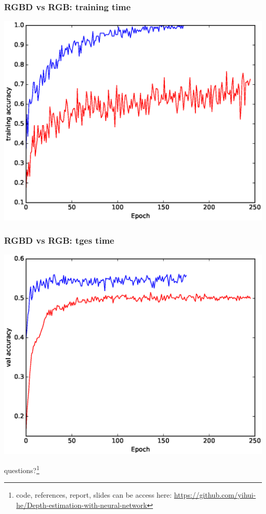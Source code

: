 \documentclass{beamer}
\begin{document}
\begin{frame}
\frametitle{RGBD vs RGB: training time}
\includegraphics[width=\linewidth]{together_train.eps}
\end{frame}


\begin{frame}
\frametitle{RGBD vs RGB: tges time}
\includegraphics[width=\linewidth]{together_test.eps}
\end{frame}


\begin{frame}
\Huge{\centerline{questions?\footnote{code, references, report, slides can be access here:
\href{https://github.com/yihui-he/Depth-estimation-with-neural-network}{https://github.com/yihui-he/Depth-estimation-with-neural-network}}}}

\end{frame}
\end{document}
